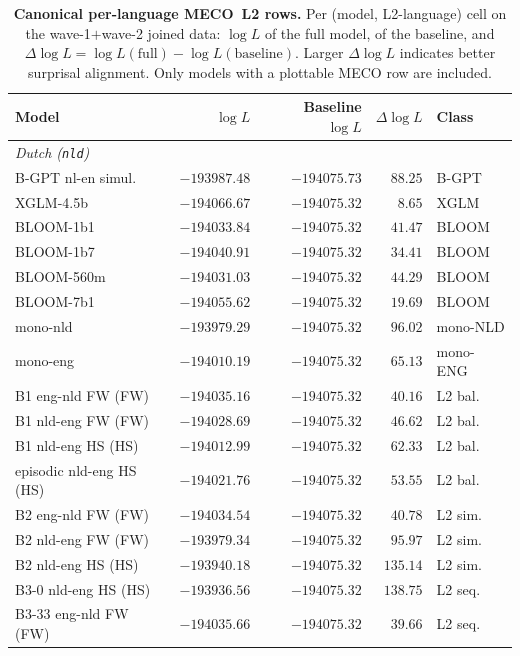 \begin{table}[!ht]
  \centering
  \small
  \caption{\textbf{Canonical per-language MECO~L2 rows.} Per (model, L2-language) cell on the wave-1$+$wave-2 joined data: $\log L$ of the full model, of the baseline, and $\Delta\log L = \log L(\text{full}) - \log L(\text{baseline})$. Larger $\Delta\log L$ indicates better surprisal alignment. Only models with a plottable MECO row are included.}
  \label{tab:meco_langrows}
  \begin{tabular}{lrrrl}
    \toprule
    Model & $\log L$ & Baseline $\log L$ & $\Delta\log L$ & Class \\
    \midrule
    \multicolumn{5}{l}{\textit{Dutch (\texttt{nld})}} \\
    \midrule
    B-GPT nl-en simul. & $-193987.48$ & $-194075.73$ & $88.25$ & B-GPT \\
    XGLM-4.5b & $-194066.67$ & $-194075.32$ & $8.65$ & XGLM \\
    BLOOM-1b1 & $-194033.84$ & $-194075.32$ & $41.47$ & BLOOM \\
    BLOOM-1b7 & $-194040.91$ & $-194075.32$ & $34.41$ & BLOOM \\
    BLOOM-560m & $-194031.03$ & $-194075.32$ & $44.29$ & BLOOM \\
    BLOOM-7b1 & $-194055.62$ & $-194075.32$ & $19.69$ & BLOOM \\
    mono-nld & $-193979.29$ & $-194075.32$ & $96.02$ & mono-NLD \\
    mono-eng & $-194010.19$ & $-194075.32$ & $65.13$ & mono-ENG \\
    B1 eng-nld FW (FW) & $-194035.16$ & $-194075.32$ & $40.16$ & L2 bal. \\
    B1 nld-eng FW (FW) & $-194028.69$ & $-194075.32$ & $46.62$ & L2 bal. \\
    B1 nld-eng HS (HS) & $-194012.99$ & $-194075.32$ & $62.33$ & L2 bal. \\
    episodic nld-eng HS (HS) & $-194021.76$ & $-194075.32$ & $53.55$ & L2 bal. \\
    B2 eng-nld FW (FW) & $-194034.54$ & $-194075.32$ & $40.78$ & L2 sim. \\
    B2 nld-eng FW (FW) & $-193979.34$ & $-194075.32$ & $95.97$ & L2 sim. \\
    B2 nld-eng HS (HS) & $-193940.18$ & $-194075.32$ & $135.14$ & L2 sim. \\
    B3-0 nld-eng HS (HS) & $-193936.56$ & $-194075.32$ & $138.75$ & L2 seq. \\
    B3-33 eng-nld FW (FW) & $-194035.66$ & $-194075.32$ & $39.66$ & L2 seq. \\

\end{tabular}
\end{table}

